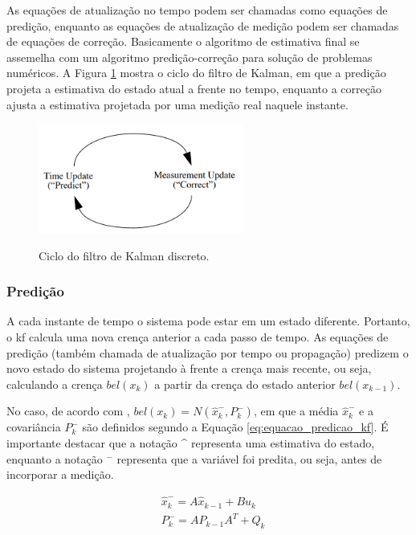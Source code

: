 \documentclass[acronym, symbols, table, deposito]{fei}
\begin{document}
			As equações de atualização no tempo podem ser chamadas como equações de predição, enquanto as equações de atualização de medição podem ser chamadas de equações de correção. Basicamente o algoritmo de estimativa final se assemelha com um algoritmo predição-correção para solução de problemas numéricos. A Figura \ref{fig:predicao_atualizacao_kalman} mostra o ciclo do filtro de Kalman, em que a predição projeta a estimativa do estado atual a frente no tempo, enquanto a correção ajusta a estimativa projetada por uma medição real naquele instante.
			
			\begin{figure}[!htb]
				\centering
				\caption{Ciclo do filtro de Kalman discreto.} 
				\includegraphics[width=0.6\textwidth]{predicao_atualizacao_kalman.png}
				\label{fig:predicao_atualizacao_kalman}
			\end{figure}
			
			\subsubsection{Predição}
				A cada instante de tempo o sistema pode estar em um estado diferente. Portanto, o \acrshort{kf} calcula uma nova crença anterior a cada passo de tempo. As equações de predição (também chamada de atualização por tempo ou propagação) predizem o novo estado do sistema projetando à frente a crença mais recente, ou seja, calculando a crença $bel(x_k)$ a partir da crença do estado anterior $bel(x_{k-1})$. 
				
				No caso, de acordo com \textcite{thrun2002probabilistic}, $bel(x_k) = N(\hat{x}_{k}^{-},P_{k}^{-})$, em que a média $\hat{x}_{k}^{-}$ e a covariância $P_{k}^{-}$ são definidos segundo a Equação \eqref{eq:equacao_predicao_kf}. É importante destacar que a notação \^{} representa uma estimativa do estado, enquanto a notação $^-$ representa que a variável foi predita, ou seja, antes de incorporar a medição.
				
				\begin{equation} \label{eq:equacao_predicao_kf}
					\begin{split}
						&\hat{x}_{k}^{-} = A\hat{x}_{k-1} + Bu_{k} \\
						&P_{k}^{-} = AP_{k-1}A^{T} + Q_{k}					
					\end{split}
				\end{equation}
			
\end{document}
